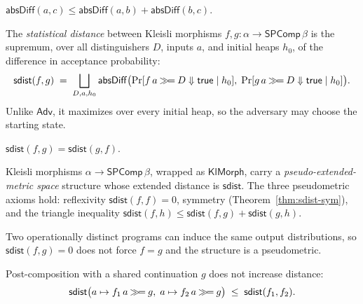 \begin{lemma}
  \label{lem:absdiff-triangle}
  \leanok
  $\mathsf{absDiff}(a, c) \le \mathsf{absDiff}(a, b) + \mathsf{absDiff}(b, c)$.
\end{lemma}

\begin{definition}
  \label{def:sdist}
  \leanok
  The \emph{statistical distance} between Kleisli morphisms
  $f, g : \alpha \to \mathsf{SPComp}\,\beta$ is the supremum, over all
  distinguishers $D$, inputs $a$, and initial heaps $h_0$, of the difference in
  acceptance probability:
  \[
    \mathsf{sdist}(f, g)
      \;=\; \bigsqcup_{D, a, h_0}
        \mathsf{absDiff}\bigl(
          \operatorname{Pr}[f\,a \mathbin{\gg\!=} D \Downarrow \mathsf{true} \mid h_0],\;
          \operatorname{Pr}[g\,a \mathbin{\gg\!=} D \Downarrow \mathsf{true} \mid h_0]\bigr).
  \]
  Unlike $\mathsf{Adv}$, it maximizes over every initial heap, so the adversary
  may choose the starting state.
\end{definition}

\begin{theorem}
  \label{thm:sdist-sym}
  \leanok
  $\mathsf{sdist}(f, g) = \mathsf{sdist}(g, f)$.
\end{theorem}

\begin{definition}
  \label{def:klmorph}
  \leanok
  Kleisli morphisms $\alpha \to \mathsf{SPComp}\,\beta$, wrapped as $\mathsf{KlMorph}$,
  carry a \emph{pseudo-extended-metric space} structure whose extended distance is
  $\mathsf{sdist}$. The three pseudometric axioms hold: reflexivity
  $\mathsf{sdist}(f, f) = 0$, symmetry (Theorem~\ref{thm:sdist-sym}), and the
  triangle inequality $\mathsf{sdist}(f, h) \le \mathsf{sdist}(f, g) + \mathsf{sdist}(g, h)$.
\end{definition}

Two operationally distinct programs can induce the same output distributions, so
$\mathsf{sdist}(f, g) = 0$ does not force $f = g$ and the structure is a pseudometric.

\begin{theorem}
  \label{thm:sdist-comp-right}
  \leanok
  Post-composition with a shared continuation $g$ does not increase distance:
  \[
    \mathsf{sdist}\bigl(a \mapsto f_1\,a \mathbin{\gg\!=} g,\; a \mapsto f_2\,a \mathbin{\gg\!=} g\bigr)
      \;\le\; \mathsf{sdist}(f_1, f_2).
  \]
\end{theorem}

